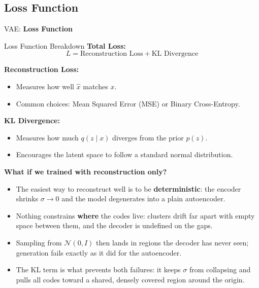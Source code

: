 \subsection{Loss Function}
\begin{frame}{}
	\LARGE VAE: \textbf{Loss Function}
\end{frame}

\begin{frame}[allowframebreaks]{Loss Function Breakdown}
\textbf{Total Loss:}
\[
L = \text{Reconstruction Loss} + \text{KL Divergence}
\]

\textbf{Reconstruction Loss:}
\begin{itemize}
    \item Measures how well $\hat{x}$ matches $x$.
    \item Common choices: Mean Squared Error (MSE) or Binary Cross-Entropy.
\end{itemize}

\textbf{KL Divergence:}
\begin{itemize}
    \item Measures how much $q(z \mid x)$ diverges from the prior $p(z)$.
    \item Encourages the latent space to follow a standard normal distribution.
\end{itemize}

\framebreak

\textbf{What if we trained with reconstruction only?}
\begin{itemize}
    \item The easiest way to reconstruct well is to be \textbf{deterministic}: the encoder shrinks $\sigma \to 0$ and the model degenerates into a plain autoencoder.
    \item Nothing constrains \textbf{where} the codes live: clusters drift far apart with empty space between them, and the decoder is undefined on the gaps.
    \item Sampling from $\mathcal{N}(0, I)$ then lands in regions the decoder has never seen; generation fails exactly as it did for the autoencoder.
    \item The KL term is what prevents both failures: it keeps $\sigma$ from collapsing and pulls all codes toward a shared, densely covered region around the origin.
\end{itemize}

\framebreak


\end{frame}
